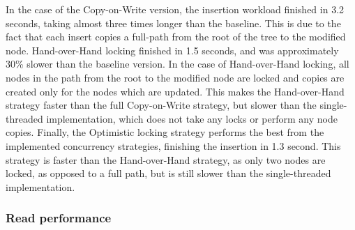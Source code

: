 \documentclass[11pt,a4paper]{globis-book}
\begin{document}
In the case of the Copy-on-Write version, the insertion workload finished in 3.2 seconds, taking almost three times longer than the baseline. This is due to the fact that each insert copies a full-path from the root of the tree to the modified node. Hand-over-Hand locking finished in 1.5 seconds, and was approximately 30\% slower than the baseline version. In the case of Hand-over-Hand locking, all nodes in the path from the root to the modified node are locked and copies are created only for the nodes which are updated. This makes the Hand-over-Hand strategy faster than the full Copy-on-Write strategy, but slower than the single-threaded implementation, which does not take any locks or perform any node copies. Finally, the Optimistic locking strategy performs the best from the implemented concurrency strategies, finishing the insertion in 1.3 second. This strategy is faster than the Hand-over-Hand strategy, as only two nodes are locked, as opposed to a full path, but is still slower than the single-threaded implementation.

\subsubsection{Read performance}
\end{document}
